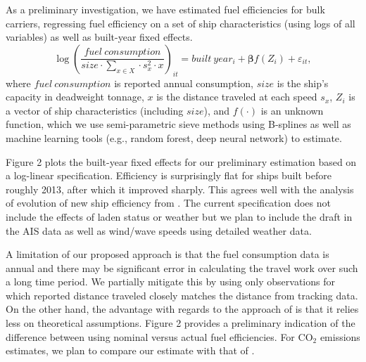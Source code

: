 \documentclass[hidelinks, 12pt,letterpaper]{article}
\begin{document}
As a preliminary investigation, we have estimated fuel efficiencies for bulk carriers, regressing fuel efficiency on a set of ship characteristics (using logs of all variables) as well as built-year fixed effects.
 \begin{equation}\label{eq1}
 \log\left(
     \frac{fuel~consumption}{size \cdot \sum_{x \in X}  \cdot s_x^2 \cdot x}
 \right)_{it}
         = built~year_{i} + \boldsymbol{\beta} f(Z_i) + \varepsilon_{it},
 \end{equation}
 where $fuel~consumption$ is reported annual consumption, $size$ is the ship's capacity in deadweight tonnage, $x$ is the distance traveled at each speed $s_x$, $Z_i$ is a vector of ship characteristics (including $size$), and $f(\cdot)$ is an unknown function, which we use semi-parametric sieve methods using B-splines as well as machine learning tools (e.g., random forest, deep neural network) to estimate.
 

Figure 2 plots the built-year fixed effects for our preliminary estimation based on a log-linear specification. Efficiency is surprisingly flat for ships built before roughly 2013, after which it improved sharply. This agrees well with the analysis of evolution of new ship efficiency from \citet[][Figure 15]{faber2015historical}. The current specification does not include the effects of laden status or weather but we plan to include the draft in the AIS data as well as wind/wave speeds using detailed weather data. %



A limitation of our proposed approach is that the fuel consumption data is annual and there may be significant error in calculating the travel work over such a long time period. We partially mitigate this by using only observations for which reported distance traveled closely matches the distance from tracking data. On the other hand, the advantage with regards to the approach of \citet{faber2020fourth} is that it relies less on theoretical assumptions. Figure 2 provides a preliminary indication of the difference between using nominal versus actual fuel efficiencies. For CO$_2$ emissions estimates, we plan to compare our estimate with that of \citet{faber2020fourth}. %
\end{document}

